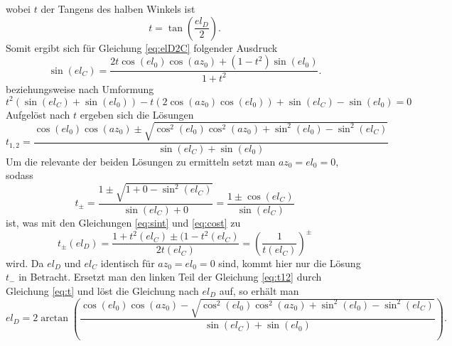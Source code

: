 wobei $t$ der Tangens des halben Winkels ist
\begin{equation}
t=\tan\left(\frac{el_D}{2}\right).
\label{eq:t}
\end{equation}
Somit ergibt sich für Gleichung \ref{eq:elD2C} folgender Ausdruck
\begin{equation}
\sin\left(el_C\right)=\frac{2t\cos\left(el_0\right)\cos\left(az_0\right)+\left(1-t^2\right)\sin\left(el_0 \right)}{1+t^2}.
\end{equation}
beziehungsweise nach Umformung
\begin{equation}
t^2\left(\sin(el_C)+\sin(el_0)\right)-t\left(2\cos(az_0)\cos(el_0)\right)+\sin(el_C)-\sin(el_0)=0
\end{equation}
Aufgelöst nach $t$ ergeben sich die Lösungen
\begin{equation}
t_{1,2}=\frac{\cos\left(el_0\right)\cos\left(az_0\right)\pm\sqrt{\cos^2\left(el_0\right)\cos^2\left(az_0\right)+\sin^2\left(el_0\right)-\sin^2\left(el_C\right)}}{\sin\left(el_C\right)+\sin\left(el_0\right)}
\label{eq:t12}
\end{equation}
Um die relevante der beiden Lösungen zu ermitteln setzt man $az_0=el_0=0$, sodass
\begin{equation}
t_{\pm}=\frac{1\pm\sqrt{1+0-\sin^2\left(el_C\right)}}{\sin\left(el_C\right)+0}=\frac{1\pm\cos\left(el_C\right)}{\sin\left(el_C\right)}
\end{equation}
ist, was mit den Gleichungen \ref{eq:sint} und \ref{eq:cost} zu 
\begin{equation}
t_{\pm}(el_D)=\frac{1+t^2(el_C)\pm(1-t^2(el_C)}{2t(el_C)}=\left(\frac{1}{t(el_C)}\right)^{\pm}
\end{equation}
wird. Da $el_D$ und $el_C$ identisch für $az_0=el_0=0$ sind, kommt hier nur die Lösung $t_-$ in Betracht. Ersetzt man den linken Teil der Gleichung \ref{eq:t12} durch Gleichung \ref{eq:t} und löst die Gleichung nach $el_D$ auf, so erhält man
\begin{equation}
el_D=2\arctan\left(\frac{\cos(el_0)\cos(az_0)-\sqrt{\cos^2(el_0)\cos^2(az_0)+\sin^2(el_0)-\sin^2(el_C)}}{\sin(el_C)+\sin(el_0)}\right).
\label{eq:elC2D}
\end{equation}

